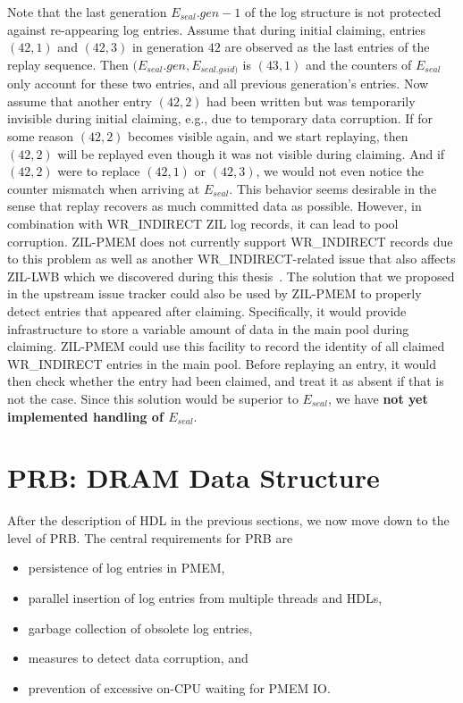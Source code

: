 \documentclass[12pt,a4paper,twoside]{book}
\begin{document}
Note that the last generation $E_{seal}.gen - 1$ of the log structure is not protected against re-appearing log entries.
Assume that during initial claiming, entries $(42,1)$ and $(42,3)$ in generation $42$ are observed as the last entries of the replay sequence.
Then $(E_{seal}.gen, E_{seal.gsid)}$ is $(43,1)$ and the counters of $E_{seal}$ only account for these two entries, and all previous generation's entries.
Now assume that another entry $(42,2)$ had been written but was temporarily invisible during initial claiming, e.g., due to temporary data corruption.
If for some reason $(42,2)$ becomes visible again, and we start replaying, then $(42,2)$ will be replayed even though it was not visible during claiming.
And if $(42,2)$ were to replace $(42,1)$ or $(42,3)$, we would not even notice the counter mismatch when arriving at $E_{seal}$.
This behavior seems desirable in the sense that replay recovers as much committed data as possible.
However, in combination with WR\_INDIRECT ZIL log records, it can lead to pool corruption.
ZIL-PMEM does not currently support WR\_INDIRECT records due to this problem as well as another WR\_INDIRECT-related issue that also affects ZIL-LWB which we discovered during this thesis~\cite{OpenZFSGithubIssueZilLeaksClaimedBlocksInSeveralEdgeCases}.
The solution that we proposed in the upstream issue tracker could also be used by ZIL-PMEM to properly detect entries that appeared after claiming.
Specifically, it would provide infrastructure to store a variable amount of data in the main pool during claiming.
ZIL-PMEM could use this facility to record the identity of all claimed WR\_INDIRECT entries in the main pool.
Before replaying an entry, it would then check whether the entry had been claimed, and treat it as absent if that is not the case.
Since this solution would be superior to $E_{seal}$, we have \textbf{not yet implemented handling of $E_{seal}$}.

\section{PRB: DRAM Data Structure}\label{di:prb:dramdatastructure}
After the description of HDL in the previous sections, we now move down to the level of PRB.
The central requirements for PRB are
\begin{itemize}[noitemsep]
    \item persistence of log entries in PMEM,
    \item parallel insertion of log entries from multiple threads and HDLs,
    \item garbage collection of obsolete log entries,
    \item measures to detect data corruption, and
    \item prevention of excessive on-CPU waiting for PMEM IO.
\end{itemize}
\end{document}
